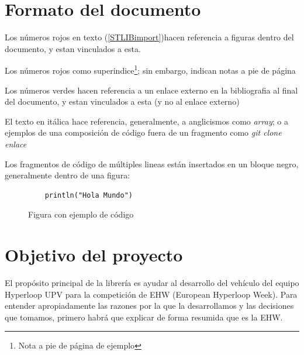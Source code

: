 \documentclass{report}
\begin{document}
\section{Formato del documento}
Los números rojos en texto (\ref{STLIBimport})hacen referencia a figuras dentro del documento, y estan vinculados a esta.
\par \vspace{0.5 cm}
Los números rojos como superindice\footnote{Nota a pie de página de ejemplo}; sin embargo, indican notas a pie de página 
\par \vspace{0.5 cm}
Los números verdes \cite{web:github:STLIB} hacen referencia a un enlace externo en la bibliografia al final del documento, y estan vinculados a esta (y no al enlace externo)
\par \vspace{0.5 cm}
El texto en itálica hace referencia, generalmente, a anglicismos como \textit{array}; o a ejemplos de una composición de código fuera de un fragmento como \textit{git clone enlace}
\par \vspace{0.5 cm}
Los fragmentos de código de múltiples lineas están insertados en un bloque negro, generalmente dentro de una figura:
\begin{figure}[h]
  \begin{lstlisting}
    println("Hola Mundo")
  \end{lstlisting}
\caption{Figura con ejemplo de código}
\label{FormatFigureExample}
\end{figure}

\setlength{\parindent}{15pt}
\newpage

\section{Objetivo del proyecto}
El propósito principal de la librería es ayudar al desarrollo del vehículo del equipo Hyperloop UPV para la competición de EHW (European Hyperloop Week). Para entender apropiadamente las razones por la que la desarrollamos y las decisiones que tomamos, primero habrá que explicar de forma resumida que es la EHW. \cite{web:EHW:homepage} \par \vspace{0.3 cm}
\end{document}
